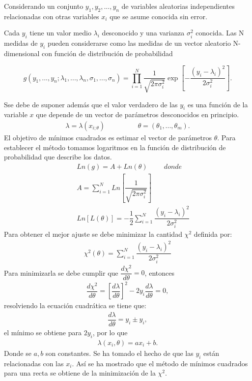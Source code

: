 \documentclass{report}
\begin{document}
	Considerando un conjunto $ y_{1}, y_{2},..., y_{n} $ de variables aleatorias independientes relacionadas con otras variables $ x_{i} $ que se asume conocida sin error. 
	
	Cada $ y_{i} $ tiene un valor medio $ \lambda_{i} $ desconocido y una varianza $ \sigma_{i}^{2} $ conocida. Las N medidas de $ y_{i} $ pueden considerarse como las medidas de un vector aleatorio N-dimensional con funci\'on de distribuci\'on de probabilidad
	
	\begin{equation*}
		g(y_{1},...,y_{n}; \lambda_{1},..., \lambda_{n}, \sigma_{1},..., \sigma_{n})=\prod_{i=1}^{N}\dfrac{1}{\sqrt{2\pi\sigma_{i}^{2}}}\exp\left [-\dfrac{(y_{i}-\lambda_{i})^{2}}{2\sigma_{i}^{2}}\right ].
	\end{equation*}
	
	Sse debe de suponer adem\'as que el valor verdadero de las $ y_{i} $ es una funci\'on de la variable $ x $ que depende de un vector de par\'ametros desconocidos en principio.
	\begin{eqnarray*}
		\lambda=\lambda(x_{i;\theta})\hspace{2cm} \theta=(\theta_{1},...,\theta_{m}).
	\end{eqnarray*} 
	El objetivo de m\'inimos cuadrados es estimar el vector de par\'ametros $ \theta $. Para establecer el m\'etodo tomamos logaritmos en la funci\'on de distribuci\'on de probabilidad que describe los datos.
	\begin{eqnarray*}
		&& Ln(g)=A+Ln(\theta) \hspace{1cm}donde \\ && A=\sum_{i=1}^{N}Ln\left [\dfrac{1}{\sqrt{2\pi\sigma_{i}^{2}}}\right ] \\ && Ln[L(\theta)]=-\dfrac{1}{2}\sum_{i=1}^{N}\dfrac{(y_{i}-\lambda_{i})^{2}}{2\sigma_{i}^{2}}
	\end{eqnarray*}  
	Para obtener el mejor ajuste se debe minimizar la cantidad $ \chi^{2} $ definida por:
	\begin{eqnarray*}
		\chi^{2}(\theta)=\sum_{i=1}^{N}\dfrac{(y_{i}-\lambda_{i})^{2}}{2\sigma_{i}^{2}}
	\end{eqnarray*}
	Para minimizarla se debe cumplir que $ \dfrac{d\chi^{2}}{d\theta}=0 $, entonces
	\begin{eqnarray*}
		\dfrac{d\chi^{2}}{d\theta}=\left [\dfrac{d\lambda}{d\theta}\right ]^{2}-2y_{i}\dfrac{d\lambda}{d\theta}=0,
	\end{eqnarray*}
	resolviendo la ecuaci\'on cuadr\'atica se tiene que:
	\begin{eqnarray*}
		\dfrac{d\lambda}{d\theta}=y_{i}\pm y_{i},
	\end{eqnarray*}
	el m\'inimo se obtiene para $ 2y_{i} $, por lo que
	\begin{eqnarray*}
		\lambda(x_{i},\theta)=ax_{i}+b.
	\end{eqnarray*}
	Donde se $ a,b $ son constantes. Se ha tomado el hecho de que las $ y_{i} $ est\'an relacionadas con las $ x_{i} $. As\'i se ha mostrado que el m\'etodo de m\'inimos cuadrados para una recta se obtiene de la minimizaci\'on de la $ \chi^{2} $. 
\end{document}
